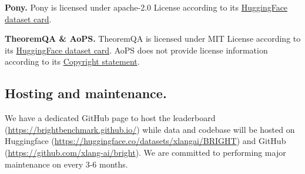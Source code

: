 \textbf{Pony.} Pony is licensed under apache-2.0 License according to its \href{https://huggingface.co/datasets/xlangai/arks_data}{HuggingFace dataset card}.

\textbf{TheoremQA \& AoPS.} TheoremQA is licensed under MIT License according to its \href{https://huggingface.co/datasets/TIGER-Lab/TheoremQA}{HuggingFace dataset card}. AoPS does not provide license information according to its \href{https://artofproblemsolving.com/wiki/index.php/AoPS_Wiki:Copyright}{Copyright statement}. 

\subsection{Hosting and maintenance.} We have a dedicated GitHub page to host the leaderboard (\url{https://brightbenchmark.github.io/}) while data and codebase will be hosted on Huggingface (\url{https://huggingface.co/datasets/xlangai/BRIGHT}) and GitHub (\url{https://github.com/xlang-ai/bright}). We are committed to performing major maintenance on \ours{} every 3-6 months.

